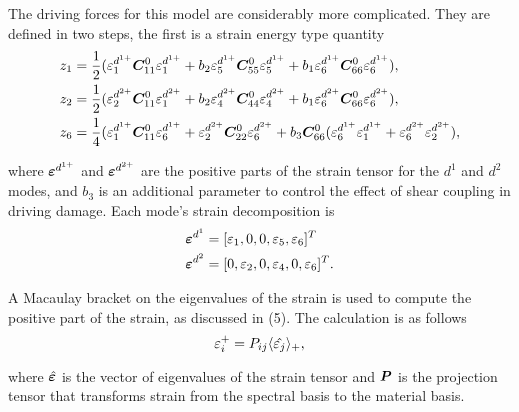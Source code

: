 \documentclass[11pt]{article}
\begin{document}
The driving forces for this model are considerably more
complicated. They are defined in two steps, the first is a strain
energy type quantity 
\begin{equation}
  \label{eq:OpenDM4_DrivingForceSE}
  \begin{split}
    z_1 &= \frac{1}{2} ( \varepsilon_{1}^{d^{1+}} \bm{C}_{11}^0 \varepsilon_{1}^{d^{1+}} + 
          b_2 \varepsilon_{5}^{d^{1+}} \bm{C}_{55}^0 \varepsilon_{5}^{d^{1+}} + 
          b_1 \varepsilon_{6}^{d^{1+}} \bm{C}_{66}^0 \varepsilon_{6}^{d^{1+}} ), \\  
    z_2 &= \frac{1}{2} ( \varepsilon_{2}^{d^{2+}} \bm{C}_{11}^0 \varepsilon_{1}^{d^{2+}} + 
          b_2 \varepsilon_{4}^{d^{2+}} \bm{C}_{44}^0 \varepsilon_{4}^{d^{2+}} + 
          b_1 \varepsilon_{6}^{d^{2+}} \bm{C}_{66}^0 \varepsilon_{6}^{d^{2+}} ), \\
    z_6 &= \frac{1}{4} ( \varepsilon_{1}^{d^{1+}} \bm{C}_{11}^0 \varepsilon_{6}^{d^{1+}} + 
          \varepsilon_{2}^{d^{2+}} \bm{C}_{22}^0 \varepsilon_{6}^{d^{2+}} + 
          b_3 \bm{C}_{66}^0 (\varepsilon_{6}^{d^{1+}} \varepsilon_{1}^{d^{1+}} +
          \varepsilon_{6}^{d^{2+}} \varepsilon_{2}^{d^{2+}} ),
  \end{split}
\end{equation}

where \(\bm{\varepsilon}^{d^{1+}}\) and \(\bm{\varepsilon}^{d^{2+}}\) are the positive parts
of the strain tensor for the \(d^1\) and \(d^2\) modes, and \(b_3\) is an
additional parameter to control the effect of shear coupling in
driving damage. Each mode's strain decomposition is
\begin{equation}
  \label{eq:OpenDM4_StrainSplit}
  \begin{split}
    \bm{\varepsilon}^{d^1} &= [\varepsilon_{1}, 0, 0, \varepsilon_{5}, \varepsilon_{6}]^T \\
    \bm{\varepsilon}^{d^2} &= [0, \varepsilon_{2}, 0, \varepsilon_{4}, 0, \varepsilon_{6}]^T. \\
  \end{split}
\end{equation}

A Macaulay bracket on the eigenvalues of the strain is used to compute
the positive part of the strain, as discussed in
(5). The calculation is as follows
\begin{equation}
  \label{eq:OpenDM4_PosPartStrain}
  \varepsilon_{i}^+ = P_{ij} \langle \hat{\varepsilon_{j}} \rangle_+,
\end{equation}

where \(\hat{\bm{\varepsilon}}\) is the vector of eigenvalues of the strain
tensor and \(\bm{P}\) is the projection tensor that transforms strain
from the spectral basis to the material basis.
\end{document}
